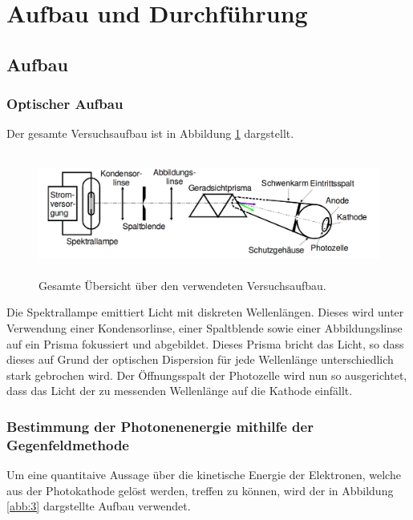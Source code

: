 \section{Aufbau und Durchführung}
\subsection{Aufbau}
\label{sec:Aufbau}

\subsubsection{Optischer Aufbau}

Der gesamte Versuchsaufbau ist in Abbildung \ref{abb:2} dargstellt.
\begin{figure}
  \centering
  \includegraphics[height=4cm]{ressources/aufbau_2.png}
  \caption{Gesamte Übersicht über den verwendeten Versuchsaufbau. \cite{skript}}
  \label{abb:2}
\end{figure}

Die Spektrallampe emittiert Licht mit diskreten Wellenlängen. Dieses wird unter Verwendung einer Kondensorlinse, einer Spaltblende sowie einer Abbildungslinse auf ein Prisma fokussiert und abgebildet.
Dieses Prisma bricht das Licht, so dass dieses auf Grund der optischen Dispersion für jede Wellenlänge unterschiedlich stark gebrochen wird.
Der Öffnungsspalt der Photozelle wird nun so ausgerichtet, dass das Licht der zu messenden Wellenlänge auf die Kathode einfällt.

\subsubsection{Bestimmung der Photonenenergie mithilfe der Gegenfeldmethode}

Um eine quantitaive Aussage über die kinetische Energie der Elektronen, welche aus der Photokathode gelöst werden, treffen zu können, wird der in Abbildung \ref{abb:3} dargstellte Aufbau verwendet.

